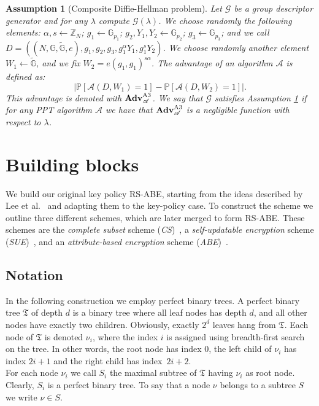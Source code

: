 \documentclass[a4paper,10pt]{article}
\newtheorem{assumption}{Assumption}
\newcommand{\G}{\mathbb{G}}
\newcommand{\GT}{\widetilde{\G}} \newcommand{\N}{\mathbb{N}}
\newcommand{\Z}{\mathbb{Z}}
\newcommand{\prob}[1]{\mathbb{P}\left[#1\right]}
\newcommand{\adv}{\textbf{Adv}}
\newcommand{\tree}{\mathfrak{T}}
\begin{document}
	\begin{assumption}[Composite Diffie-Hellman problem]
		\label{a3}
		Let $\mathscr{G}$ be a group descriptor generator and for any $\lambda$ compute $\mathscr{G}(\lambda)$.
		We choose randomly the following elements:
			$\alpha,s \leftarrow{} \Z_{N}$;
			$g_1 \leftarrow{} \G_{p_1}$;
			$g_2,Y_1,Y_2 \leftarrow{} \G_{p_2}$;
			$g_3 \leftarrow{} \G_{p_3}$;
		and we call \linebreak 
		$D=\left((N,\G,\GT,e),g_1,g_2,g_3,g_1^\alpha Y_1,g_1^s Y_2\right)$. 
		We choose randomly another element
			$W_1 \leftarrow{} \GT$,
		and we fix $W_2=e(g_1,g_1)^{s\alpha}$.
		The advantage of an algorithm $\mathscr{A}$ is defined as:
		\[
			\left|\prob{\mathscr{A}(D,W_1)=1}-\prob{\mathscr{A}(D,W_2)=1}\right|.
		\]
		This advantage is denoted with $\adv^{\textnormal{A3}}_{\mathscr{A}}$.
		We say that $\mathscr{G}$ satisfies Assumption \ref{a3} if for any PPT algorithm $\mathscr{A}$ we have that $\adv^{\textnormal{A3}}_{\mathscr{A}}$ is a negligible function with respect to $\lambda$.
	\end{assumption}
	


	





	\section{Building blocks}\label{sec:block}
	
	We build our original key policy RS-ABE, starting from the ideas described by Lee et al.~\cite{lee2013RSABE} and adapting them to the key-policy case. To construct the scheme we outline three different schemes, which are later merged to form RS-ABE. These schemes are the \emph{complete subset} scheme (\emph{CS})~\cite{naor2001SC}, a \emph{self-updatable encryption} scheme (\emph{SUE})~\cite{lee2013RSABE}, and an \emph{attribute-based encryption} scheme (\emph{ABE})~\cite{lewko2010ABE}.


	\subsection{Notation}
	In the following construction we employ perfect binary trees. 
A perfect binary tree $\tree{}$ of depth $d$ is a binary tree where all leaf nodes has depth $d$, and all other nodes have exactly two children. Obviously,  exactly $2^d$ leaves hang from $\tree{}$. Each node of $\tree{}$ is denoted  $\nu_{i}$, where the index $i$ is assigned using breadth-first search on the tree. In other words, the root node has index $0$, the left child of $\nu_i$ has index $2i+1$ and the right child has index~$2i+2$.\\ 
	For each node $\nu_i$ we call $S_i$ the maximal subtree of $\tree{}$ having $\nu_i$ as root node. Clearly, $S_i$ is a perfect binary tree. To say that a node $\nu$ belongs to a subtree $S$ we write $\nu\in S$.
	
\end{document}
